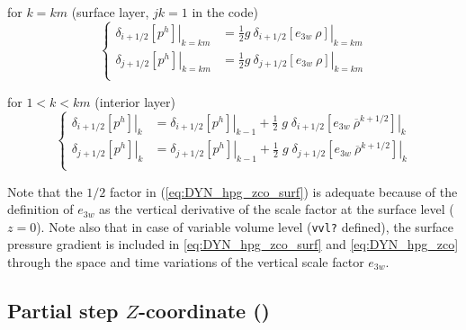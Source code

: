 \documentclass[../main/NEMO_manual]{subfiles}
\begin{document}
for $k=km$ (surface layer, $jk=1$ in the code)
\begin{equation}
  \label{eq:DYN_hpg_zco_surf}
  \left\{
    \begin{aligned}
      \left. \delta_{i+1/2} \left[  p^h 			 \right] \right|_{k=km}
      &= \frac{1}{2} g \ 	\left. \delta_{i+1/2} \left[  e_{3w} \ \rho \right] \right|_{k=km}   \\
      \left. \delta_{j+1/2} \left[  p^h  			 \right] \right|_{k=km}
      &= \frac{1}{2} g \ 	\left. \delta_{j+1/2} \left[  e_{3w} \ \rho \right] \right|_{k=km}   \\
    \end{aligned}
  \right.
\end{equation}

for $1<k<km$ (interior layer)
\begin{equation}
  \label{eq:DYN_hpg_zco}
  \left\{
    \begin{aligned}
      \left. \delta_{i+1/2} \left[  p^h 			 \right] \right|_{k}
      &=					\left. \delta_{i+1/2} \left[  p^h 			 \right] \right|_{k-1}
      +    \frac{1}{2}\;g\;	\left. \delta_{i+1/2} \left[  e_{3w} \ \overline {\rho}^{k+1/2} \right] \right|_{k}   \\
      \left. \delta_{j+1/2} \left[  p^h  			 \right] \right|_{k}
      &=     				\left. \delta_{j+1/2} \left[  p^h  			 \right] \right|_{k-1}
      +    \frac{1}{2}\;g\;	\left. \delta_{j+1/2} \left[  e_{3w} \ \overline {\rho}^{k+1/2} \right] \right|_{k}   \\
    \end{aligned}
  \right.
\end{equation}

Note that the $1/2$ factor in (\autoref{eq:DYN_hpg_zco_surf}) is adequate because of the definition of $e_{3w}$ as
the vertical derivative of the scale factor at the surface level ($z=0$).
Note also that in case of variable volume level (\texttt{vvl?} defined),
the surface pressure gradient is included in \autoref{eq:DYN_hpg_zco_surf} and
\autoref{eq:DYN_hpg_zco} through the space and time variations of the vertical scale factor $e_{3w}$.

\subsection[Partial step $Z$-coordinate (\forcode{ln_dynhpg_zps})]{Partial step $Z$-coordinate (\protect{})}
\label{subsec:DYN_hpg_zps}
\end{document}
